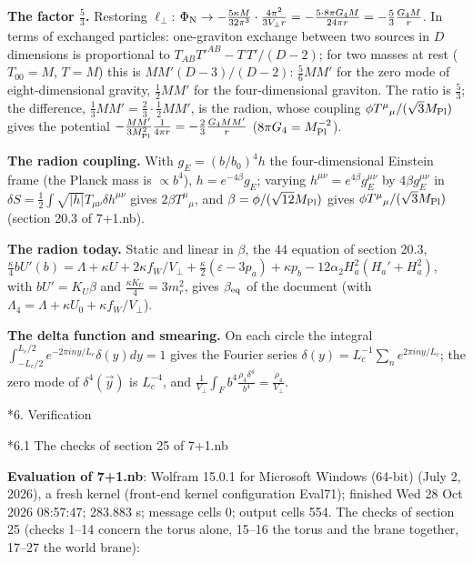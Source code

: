 \documentclass[10pt,a4paper]{article}
\makeatletter
\renewcommand\section{\@startsection{section}{1}{\z@}{-3.5ex \@plus -1ex \@minus -.2ex}{2.3ex \@plus.2ex}{\normalfont\Large\bfseries\raggedright}}
\renewcommand\subsection{\@startsection{subsection}{2}{\z@}{-3.25ex\@plus -1ex \@minus -.2ex}{1.5ex \@plus .2ex}{\normalfont\large\bfseries\raggedright}}
\makeatother
\begin{document}
\textbf{The factor $\frac53$.} Restoring $\ell_\perp$: $\Phi_{\rm N}\to-\frac{5\kappa M}{32\pi^3}\cdot\frac{4\pi^2}{3V_\perp r}=-\frac{5\cdot8\pi G_4M}{24\pi r}=-\frac53\frac{G_4M}r$. In terms of exchanged particles: one-graviton exchange between two sources in $D$ dimensions is proportional to $T_{AB}T'^{AB}-T\,T'/(D-2)$; for two masses at rest ($T_{00}=M$, $T=M$) this is $MM'(D-3)/(D-2)$: $\frac56MM'$ for the zero mode of eight-dimensional gravity, $\frac12MM'$ for the four-dimensional graviton. The ratio is $\frac53$; the difference, $\frac13MM'=\frac23\cdot\frac12MM'$, is the radion, whose coupling $\phi T^\mu{}_\mu/(\sqrt3M_{\rm Pl})$ gives the potential $-\frac{MM'}{3M_{\rm Pl}^2}\frac1{4\pi r}=-\frac23\frac{G_4MM'}r$ ($8\pi G_4=M_{\rm Pl}^{-2}$).

\textbf{The radion coupling.} With $g_E=(b/b_0)^4h$ the four-dimensional Einstein frame (the Planck mass is $\propto b^4$), $h=e^{-4\beta}g_E$; varying $h^{\mu\nu}=e^{4\beta}g_E^{\mu\nu}$ by $4\beta g_E^{\mu\nu}$ in $\delta S=\frac12\int\sqrt{|h|}T_{\mu\nu}\delta h^{\mu\nu}$ gives $2\beta T^\mu{}_\mu$, and $\beta=\phi/(\sqrt{12}M_{\rm Pl})$ gives $\phi T^\mu{}_\mu/(\sqrt3M_{\rm Pl})$ (section 20.3 of 7+1.nb).

\textbf{The radion today.} Static and linear in $\beta$, the $44$ equation of section 20.3, $\frac\kappa4bU'(b)=\Lambda+\kappa U+2\kappa f_W/V_\perp+\frac\kappa2(\varepsilon-3p_a)+\kappa p_b-12\alpha_2H_a^2(H_a'+H_a^2)$, with $bU'=K_U\beta$ and $\frac{\kappa K_U}4=3m_r^2$, gives $\beta_{\rm eq}$ of the document (with $\Lambda_4=\Lambda+\kappa U_0+\kappa f_W/V_\perp$).

\textbf{The delta function and smearing.} On each circle the integral $\int_{-L_c/2}^{L_c/2}e^{-2\pi iny/L_c}\delta(y)dy=1$ gives the Fourier series $\delta(y)=L_c^{-1}\sum_ne^{2\pi iny/L_c}$; the zero mode of $\delta^4(\vec y)$ is $L_c^{-4}$, and $\frac1{V_\perp}\int_Fb^4\frac{\rho_4\delta^4}{b^4}=\frac{\rho_4}{V_\perp}$.

\section*{6. Verification}
\subsection*{6.1 The checks of section 25 of 7+1.nb}
\textbf{Evaluation of 7+1.nb}: Wolfram 15.0.1 for Microsoft Windows (64-bit) (July 2, 2026), a fresh kernel (front-end kernel configuration Eval71); finished Wed 28 Oct 2026 08:57:47; 283.883 s; message cells 0; output cells 554. The checks of section 25 (checks 1–14 concern the torus alone, 15–16 the torus and the brane together, 17–27 the world brane):
\end{document}
